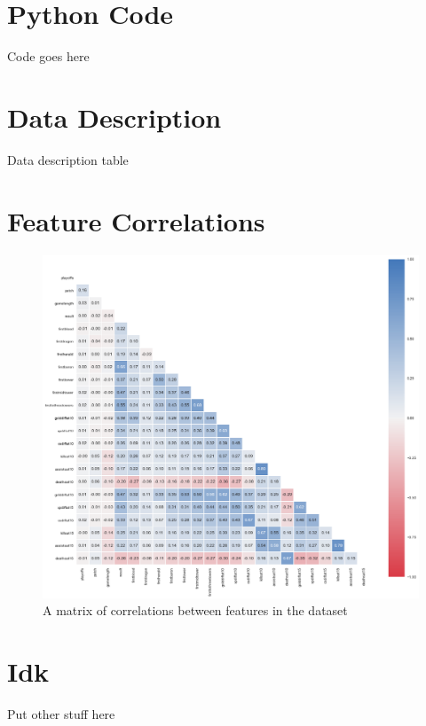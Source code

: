 
\chapter{Python Code}\label{ch:Python Code}

Code goes here

\chapter{Data Description}\label{ch:Data Description}

Data description table

\chapter{Feature Correlations}\label{ch:Feature Correlations}

\begin{figure}[h!]
    \centering
    \includegraphics[width=1\textwidth]{figures/CorrMat1}
    \caption{A matrix of correlations between features in the dataset}
    \label{fig:CorrMat1}
\end{figure}

\chapter{Idk}\label{ch:Idk}

Put other stuff here